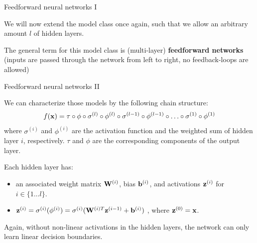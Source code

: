 \documentclass[11pt,compress,t,notes=noshow, xcolor=table]{beamer}
\begin{document}



\begin{framei}[sep=L]{Feedforward neural networks I}
\item We will now extend the model class once again, such that we allow an arbitrary amount $l$ of hidden layers.
\vfill
\item The general term for this model class is (multi-layer) \textbf{feedforward networks} (inputs are passed through the network from left to right, no feedback-loops are allowed)
\end{framei}

\begin{framei}{Feedforward neural networks II}
\item We can characterize those models by the following chain structure: $$f(\mathbf{x}) = \tau \circ \phi \circ \sigma^{(l)} \circ \phi^{(l)} \circ \sigma^{(l-1)} \circ \phi^{(l-1)} \circ \ldots \circ \sigma^{(1)} \circ \phi^{(1)}$$ where $\sigma^{(i)}$ and $\phi^{(i)}$ are the activation function and the weighted sum of hidden layer $i$, respectively. $\tau$ and $\phi$ are the corresponding components of the output layer.
\vfill
\item Each hidden layer has: 
\begin{itemize}
\vfill
\item an associated weight matrix $\mathbf{W}^{(i)}$, bias $\mathbf{b}^{(i)}$, and activations $\mathbf{z}^{(i)}$ for $i \in \{ 1 \ldots l\}$.
\vfill
\item $\mathbf{z}^{(i)} = \sigma^{(i)}(\phi^{(i)}) = \sigma^{(i)}(\mathbf{W}^{(i)T}\mathbf{z}^{(i - 1)} + \mathbf{b}^{(i)})$ , where $\mathbf{z}^{(0)} = \mathbf{x}$.
\end{itemize}
\vfill
\item Again, without non-linear activations in the hidden layers, the network can only learn linear decision boundaries.
\end{framei}
\end{document}
